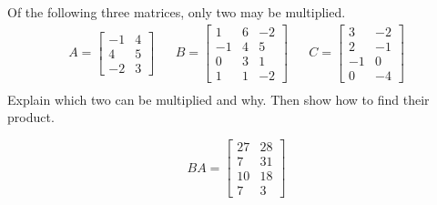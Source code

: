 
\begin{exerciseStatement}


Of the following three matrices, only two may be multiplied. 
\begin{align*} A= \left[\begin{array}{cc}
-1 & 4 \\
4 & 5 \\
-2 & 3
\end{array}\right]  & & B= \left[\begin{array}{ccc}
1 & 6 & -2 \\
-1 & 4 & 5 \\
0 & 3 & 1 \\
1 & 1 & -2
\end{array}\right]  & & C= \left[\begin{array}{cc}
3 & -2 \\
2 & -1 \\
-1 & 0 \\
0 & -4
\end{array}\right]  \\ \end{align*}
             Explain which two can be multiplied and why. Then show how to find their product.


\end{exerciseStatement}
    
\begin{exerciseAnswer} 
\[BA= \left[\begin{array}{cc}
27 & 28 \\
7 & 31 \\
10 & 18 \\
7 & 3
\end{array}\right] \]
\end{exerciseAnswer}
    
